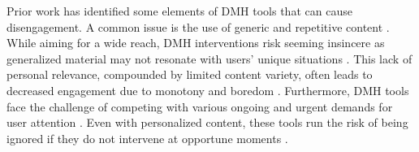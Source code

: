 
Prior work has identified some elements of DMH tools that can cause disengagement. A common issue is the use of generic and repetitive content \cite{bhattacharjee2022design, rennick2016health, brown2014mobile}. While aiming for a wide reach, DMH interventions risk seeming insincere as generalized material may not resonate with users' unique situations \cite{bhattacharjee2023investigating, slovak2023designing}. This lack of personal relevance, compounded by limited content variety, often leads to decreased engagement due to monotony and boredom \cite{brown2014mobile}.
Furthermore, DMH tools face the challenge of competing with various ongoing and urgent demands for user attention \cite{muench2017more}. Even with personalized content, these tools run the risk of being ignored if they do not intervene at opportune moments \cite{bhattacharjee2022design}. 

